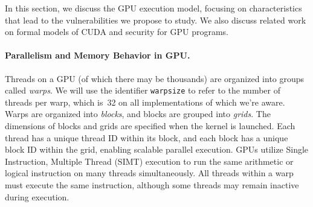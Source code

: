 \label{sec:background}
In this section, we discuss the GPU execution model, focusing on characteristics that lead to the vulnerabilities we propose to study.
%
We also discuss related work on formal models of CUDA and security for GPU programs.









\paragraph{Parallelism and Memory Behavior in GPU.}
Threads on a GPU (of which there may be thousands) are organized into groups
called {\em warps}.
%
We will use the identifier \texttt{warpsize} to refer to the number of threads
per warp, which is~32 on all implementations of which we're aware.
%
Warps are organized into {\em blocks}, and blocks are grouped into {\em grids}. The dimensions of blocks and grids are specified when the kernel is launched.
%
Each thread has a unique thread ID within its block, and each block has a unique block ID within the grid, enabling scalable parallel execution.
%
GPUs utilize Single Instruction, Multiple Thread (SIMT) execution to run the same arithmetic or logical instruction on many threads simultaneously.
%
All threads within a warp must execute the same instruction, although some threads may remain inactive during execution.

